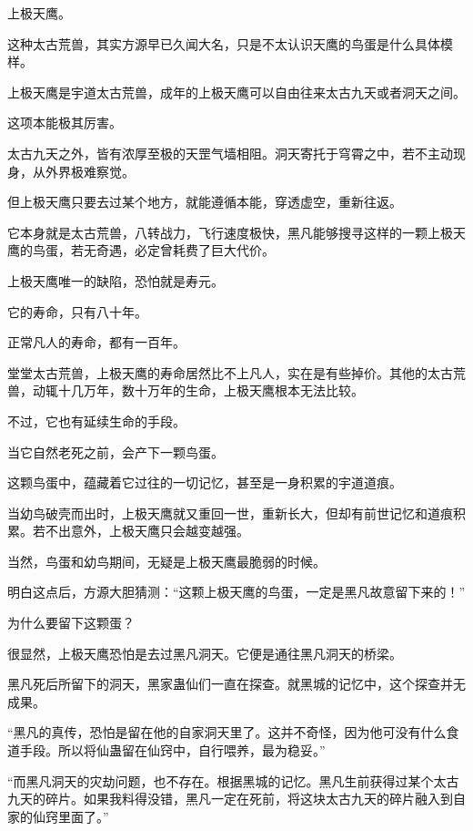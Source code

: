 
\begin{this_body}

上极天鹰。

这种太古荒兽，其实方源早已久闻大名，只是不太认识天鹰的鸟蛋是什么具体模样。

上极天鹰是宇道太古荒兽，成年的上极天鹰可以自由往来太古九天或者洞天之间。

这项本能极其厉害。

太古九天之外，皆有浓厚至极的天罡气墙相阻。洞天寄托于穹霄之中，若不主动现身，从外界极难察觉。

但上极天鹰只要去过某个地方，就能遵循本能，穿透虚空，重新往返。

它本身就是太古荒兽，八转战力，飞行速度极快，黑凡能够搜寻这样的一颗上极天鹰的鸟蛋，若无奇遇，必定曾耗费了巨大代价。

上极天鹰唯一的缺陷，恐怕就是寿元。

它的寿命，只有八十年。

正常凡人的寿命，都有一百年。

堂堂太古荒兽，上极天鹰的寿命居然比不上凡人，实在是有些掉价。其他的太古荒兽，动辄十几万年，数十万年的生命，上极天鹰根本无法比较。

不过，它也有延续生命的手段。

当它自然老死之前，会产下一颗鸟蛋。

这颗鸟蛋中，蕴藏着它过往的一切记忆，甚至是一身积累的宇道道痕。

当幼鸟破壳而出时，上极天鹰就又重回一世，重新长大，但却有前世记忆和道痕积累。若不出意外，上极天鹰只会越变越强。

当然，鸟蛋和幼鸟期间，无疑是上极天鹰最脆弱的时候。

明白这点后，方源大胆猜测：“这颗上极天鹰的鸟蛋，一定是黑凡故意留下来的！”

为什么要留下这颗蛋？

很显然，上极天鹰恐怕是去过黑凡洞天。它便是通往黑凡洞天的桥梁。

黑凡死后所留下的洞天，黑家蛊仙们一直在探查。就黑城的记忆中，这个探查并无成果。

“黑凡的真传，恐怕是留在他的自家洞天里了。这并不奇怪，因为他可没有什么食道手段。所以将仙蛊留在仙窍中，自行喂养，最为稳妥。”

“而黑凡洞天的灾劫问题，也不存在。根据黑城的记忆。黑凡生前获得过某个太古九天的碎片。如果我料得没错，黑凡一定在死前，将这块太古九天的碎片融入到自家的仙窍里面了。”


\end{this_body}

